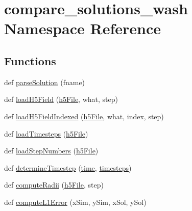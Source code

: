 \hypertarget{namespacecompare__solutions__wash}{}\section{compare\+\_\+solutions\+\_\+wash Namespace Reference}
\label{namespacecompare__solutions__wash}
\subsection*{Functions}
\begin{DoxyCompactItemize}
\item 
def \mbox{\hyperlink{namespacecompare__solutions__wash_ae62cbff3d508ce20459a98127dfb1ae5}{parse\+Solution}} (fname)
\item 
def \mbox{\hyperlink{namespacecompare__solutions__wash_a33b80a6270677304a6b35ebb66823a61}{load\+H5\+Field}} (\mbox{\hyperlink{namespacecompare__solutions__wash_a134c58f3c3cb96d84b6070546fd6830c}{h5\+File}}, what, step)
\item 
def \mbox{\hyperlink{namespacecompare__solutions__wash_afbcdb3d9e80bd0dfe06fba04102488b5}{load\+H5\+Field\+Indexed}} (\mbox{\hyperlink{namespacecompare__solutions__wash_a134c58f3c3cb96d84b6070546fd6830c}{h5\+File}}, what, index, step)
\item 
def \mbox{\hyperlink{namespacecompare__solutions__wash_a45f4b24054ceb028d7ca53bcdeefef5f}{load\+Timesteps}} (\mbox{\hyperlink{namespacecompare__solutions__wash_a134c58f3c3cb96d84b6070546fd6830c}{h5\+File}})
\item 
def \mbox{\hyperlink{namespacecompare__solutions__wash_a13dfad6bbc2ba1a437ee77253075b68a}{load\+Step\+Numbers}} (\mbox{\hyperlink{namespacecompare__solutions__wash_a134c58f3c3cb96d84b6070546fd6830c}{h5\+File}})
\item 
def \mbox{\hyperlink{namespacecompare__solutions__wash_a63cd726e61321a8fc75b08386a4f58fc}{determine\+Timestep}} (\mbox{\hyperlink{namespacecompare__solutions__wash_addfb10b27eaa62790f49a45459f6dbc5}{time}}, \mbox{\hyperlink{namespacecompare__solutions__wash_acd63a8b5cbad89bba3c4ca2abf9a8231}{timesteps}})
\item 
def \mbox{\hyperlink{namespacecompare__solutions__wash_a9563fef2b2c5b092ed811a3bbbf20f3e}{compute\+Radii}} (\mbox{\hyperlink{namespacecompare__solutions__wash_a134c58f3c3cb96d84b6070546fd6830c}{h5\+File}}, step)
\item 
def \mbox{\hyperlink{namespacecompare__solutions__wash_aafcb27af091ee03dd6f847cb5bc8dff9}{compute\+L1\+Error}} (x\+Sim, y\+Sim, x\+Sol, y\+Sol)

\end{DoxyCompactItemize}
